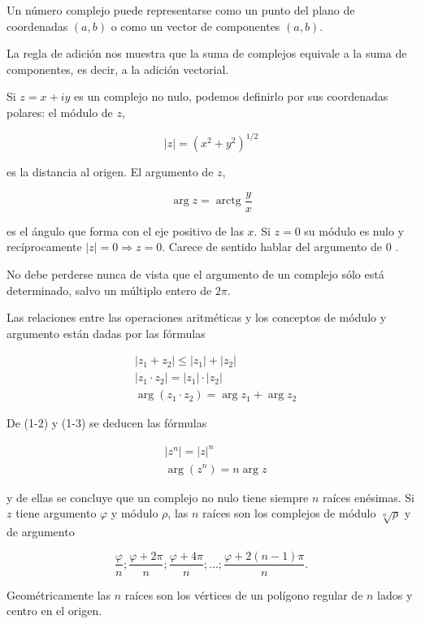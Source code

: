\documentclass[10pt]{article}
\theoremstyle{plain}
\theoremstyle{definition}
\theoremstyle{remark}
\begin{document}
Un número complejo puede representarse como un punto del plano de coordenadas $(a, b)$ o como un vector de componentes $(a, b)$.

La regla de adición nos muestra que la suma de complejos equivale a la suma de componentes, es decir, a la adición vectorial.

Si $z=x+i y$ es un complejo no nulo, podemos definirlo por sus coordenadas polares: el módulo de $z$,

$$
|z|=\left(x^{2}+y^{2}\right)^{1 / 2}
$$

es la distancia al origen. El argumento de $z$,

$$
\arg z=\operatorname{arctg} \frac{y}{x}
$$

es el ángulo que forma con el eje positivo de las $x$.
Si $z=0$ su módulo es nulo y recíprocamente $|z|=0 \Rightarrow z=0$. Carece de sentido hablar del argumento de 0 .

No debe perderse nunca de vista que el argumento de un complejo sólo está determinado, salvo un múltiplo entero de $2 \pi$.

Las relaciones entre las operaciones aritméticas y los conceptos de módulo y argumento están dadas por las fórmulas


\begin{align*}
& \left|z_{1}+z_{2}\right| \leqslant\left|z_{1}\right|+\left|z_{2}\right|  \tag{$1\cdot1$}\\
& \left|z_{1} \cdot z_{2}\right|=\left|z_{1}\right| \cdot\left|z_{2}\right|  \tag{1-2}\\
& \arg \left(z_{1} \cdot z_{2}\right)=\arg z_{1}+\arg z_{2} \tag{$1\cdot3$}
\end{align*}


De (1-2) y (1-3) se deducen las fórmulas


\begin{align*}
& \left|z^{n}\right|=|z|^{n}  \tag{1-4}\\
& \arg \left(z^{n}\right)=n \arg z \tag{1-5}
\end{align*}


y de ellas se concluye que un complejo no nulo tiene siempre $n$ raíces enésimas. Si $z$ tiene argumento $\varphi$ y módulo $\rho$, las $n$ raíces son los complejos de módulo $\sqrt[n]{\rho}$ y de argumento

$$
\frac{\varphi}{n} ; \frac{\varphi+2 \pi}{n} ; \frac{\varphi+4 \pi}{n} ; \ldots ; \frac{\varphi+2(n-1) \pi}{n} .
$$

Geométricamente las $n$ raíces son los vértices de un polígono regular de $n$ lados y centro en el origen.
\end{document}
